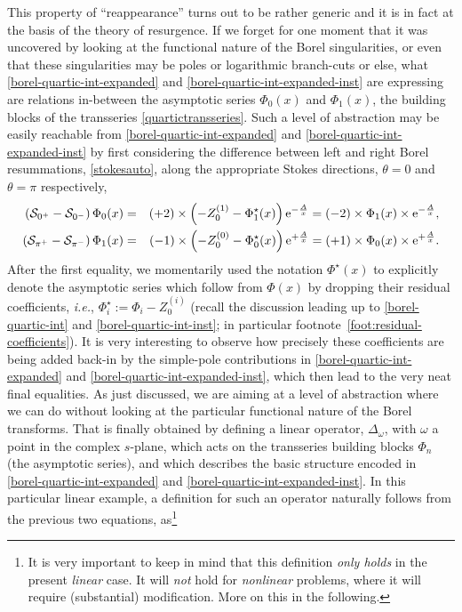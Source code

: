 \documentclass[11pt,a4paper]{article}
\newcommand{\CS}{{\cal S}}
\newcommand{\bea}{\begin{eqnarray}}
\newcommand{\eea}{\end{eqnarray}}
\newcommand{\rme}{{\mathrm{e}}}
\begin{document}
This property of ``reappearance'' turns out to be rather generic and it is in fact at the basis of the theory of resurgence. If we forget for one moment that it was uncovered by looking at the functional nature of the Borel singularities, or even that these singularities may be poles or logarithmic branch-cuts or else, what \eqref{borel-quartic-int-expanded} and \eqref{borel-quartic-int-expanded-inst} are expressing are relations in-between the asymptotic series $\Phi_{0} (x)$ and $\Phi_{1} (x)$, the building blocks of the transseries \eqref{quartictransseries}. Such a level of abstraction may be easily reachable from \eqref{borel-quartic-int-expanded} and \eqref{borel-quartic-int-expanded-inst} by first considering the difference between left and right Borel resummations, \eqref{stokesauto}, along the appropriate Stokes directions, $\theta=0$ and $\theta=\pi$ respectively,
%
\bea
\label{disc-to-alien-Phi0}
\left( \CS_{0^+} - \CS_{0^-} \right) \Phi_0 (x) &=& \left( + 2 \right) \times \left( - Z_{0}^{(1)} - \Phi_1^\star (x) \right) \rme^{-\frac{A}{x}} = \left( - 2 \right) \times \Phi_1 (x) \times \rme^{-\frac{A}{x}},
\\
\label{disc-to-alien-Phi1}
\left( \CS_{\pi^+} - \CS_{\pi^-} \right) \Phi_1 (x) &=& \left( - 1 \right) \times \left( - Z_{0}^{(0)} - \Phi_0^\star (x) \right) \rme^{+\frac{A}{x}} = \left( + 1 \right) \times \Phi_0 (x) \times \rme^{+\frac{A}{x}}.
\eea
%
\noindent
After the first equality, we momentarily used the notation $\Phi^\star (x)$ to explicitly denote the asymptotic series which follow from $\Phi (x)$ by dropping their residual coefficients, \textit{i.e.}, $\Phi_i^\star := \Phi_i - Z^{(i)}_0$ (recall the discussion leading up to \eqref{borel-quartic-int} and \eqref{borel-quartic-int-inst}; in particular footnote~\ref{foot:residual-coefficients}). It is very interesting to observe how precisely these coefficients are being added back-in by the simple-pole contributions in \eqref{borel-quartic-int-expanded} and \eqref{borel-quartic-int-expanded-inst}, which then lead to the very neat final equalities. As just discussed, we are aiming at a level of abstraction where we can do without looking at the particular functional nature of the Borel transforms. That is finally obtained by defining a linear operator, $\Delta_\omega$, with $\omega$ a point in the complex $s$-plane, which acts on the transseries building blocks $\Phi_{n}$ (the asymptotic series), and which describes the basic structure encoded in \eqref{borel-quartic-int-expanded} and \eqref{borel-quartic-int-expanded-inst}. In this particular linear example, a definition for such an operator naturally follows from the previous two equations, as\footnote{It is very important to keep in mind that this definition \textit{only holds} in the present \textit{linear} case. It will \textit{not} hold for \textit{nonlinear} problems, where it will require (substantial) modification. More on this in the following.}
\end{document}
